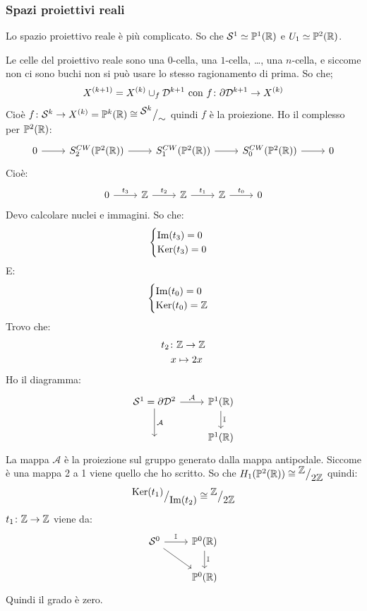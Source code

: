\subsubsection{Spazi proiettivi reali}
Lo spazio proiettivo reale è più complicato. So che
$ \mathcal{S}^{1} \simeq \mathbb{P}^{1} (\mathbb{R}) $ e $ U_1 \simeq \mathbb{P}^{2} (\mathbb{R}) $.

Le celle del proiettivo reale sono una $ 0 $-cella, una $ 1 $-cella, \dots, una
$ n $-cella, e siccome non ci sono buchi non si può usare lo stesso ragionamento
di prima. So che;
\[
  X^{(k+1)} = X^{(k)} \cup_f \mathcal{D}^{k+1} \text{ con } f \colon \partial \mathcal{D}^{k+1} \to X^{(k)}
\]
Cioè $ f \colon \mathcal{S}^{k} \to X^{(k)} = \mathbb{P}^{k} (\mathbb{R}) \cong {^{\textstyle \mathcal{S}^{k}}\big/_{\textstyle \sim}} $ quindi
$ f $ è la proiezione. Ho il complesso per $ \mathbb{P}^{2} (\mathbb{R}) $:
\[
  \begin{tikzcd}
    0 \rar & S^{CW}_{2}(\Pjr{2}) \rar & S_1^{CW}(\Pjr{2}) \rar & S_{0}^{CW}(\Pjr{2}) \rar & 0
  \end{tikzcd}
\]
Cioè:
\[
  \begin{tikzcd}
    0 \rar{t_3} & \Z \rar{t_2} & \Z \rar{t_1} & \Z \rar{t_0} & 0
  \end{tikzcd}
\]
Devo calcolare nuclei e immagini. So che:
\[
  \begin{cases}
    \mathrm{Im}( t_3 ) = 0 \\
    \mathrm{Ker}( t_3) = 0
  \end{cases}
\]
E:
\[
  \begin{cases}
    \mathrm{Im}( t_0 ) = 0\\
    \mathrm{Ker}( t_0) = \mathbb{Z}
  \end{cases}
\]
Trovo che:
\begin{align*}
  t_2 \colon & \mathbb{Z} \to \mathbb{Z} \\
  x & \mapsto 2 x
\end{align*}
Ho il diagramma:
\[
  \begin{tikzcd}
    \Sph{1} = \partial \Disk{2} \rar{\mathcal{A}} \dar{\mathcal{A}} & \Pjr{1} \dar{\Id{}} \\
    {} & \Pjr{1}
  \end{tikzcd}
\]
La mappa $ \mathcal{A} $ è la proiezione sul gruppo generato dalla mappa antipodale.
Siccome è una mappa 2 a 1 viene quello che ho scritto.
So che $ H_1(\mathbb{P}^{2} (\mathbb{R})) \cong {^{\textstyle \mathbb{Z}}\big/_{\textstyle 2 \mathbb{Z}}} $ quindi:
\[
  {^{\textstyle \mathrm{Ker}( t_1)}\big/_{\textstyle \mathrm{Im}( t_2 )}} \cong {^{\textstyle \mathbb{Z}}\big/_{\textstyle 2 \mathbb{Z}}}
\]
$ t_1 \colon \mathbb{Z} \to \mathbb{Z} $ viene da:
\[
  \begin{tikzcd}
    \Sph{0} \rar{\Id{}} \arrow{rd}{} & \Pjr{0} \dar{\Id{}} \\
    {} & \Pjr{0}
  \end{tikzcd}
\]
Quindi il grado è zero.

